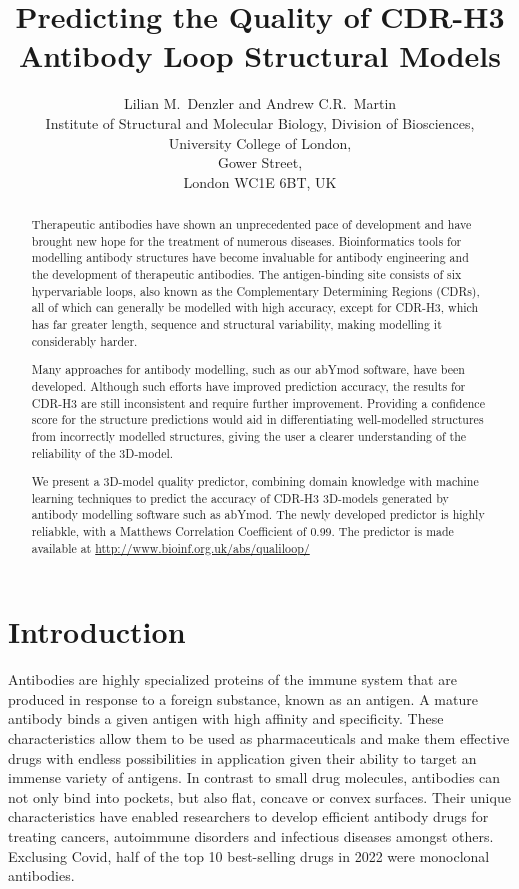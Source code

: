 \documentclass[12pt]{article}
\title{Predicting the Quality of CDR-H3 Antibody Loop Structural Models}
\author{Lilian M.\ Denzler and Andrew C.R.\ Martin\\
Institute of Structural and Molecular Biology, Division of Biosciences,\\
University College of London,\\
Gower Street,\\
London WC1E 6BT, UK
}
\begin{document}
\maketitle

\begin{abstract}
  Therapeutic antibodies have shown an unprecedented pace of
  development and have brought new hope for the treatment of numerous
  diseases. Bioinformatics tools for modelling antibody structures
  have become invaluable for antibody engineering and the development
  of therapeutic antibodies. The antigen-binding site consists of six
  hypervariable loops, also known as the Complementary Determining
  Regions (CDRs), all of which can generally be modelled with high accuracy,
  except for CDR-H3, which has
  far greater length, sequence and structural variability, 
  making modelling it considerably harder.

  Many approaches for antibody modelling, such as our
  abYmod software, have been developed. Although such efforts have
  improved prediction accuracy, the results for CDR-H3 are
  still inconsistent and require further improvement. Providing a
  confidence score for the structure predictions would aid in
  differentiating well-modelled structures from incorrectly modelled
  structures, giving the user a clearer understanding of the
  reliability of the 3D-model.

  We present a 3D-model quality predictor, combining domain knowledge
  with machine learning techniques to predict the accuracy of CDR-H3
  3D-models generated by antibody modelling software such as abYmod. The
  newly developed predictor is highly reliabkle, with a Matthews Correlation Coefficient
  of 0.99. The predictor
  is made available at \url{http://www.bioinf.org.uk/abs/qualiloop/}
\end{abstract}

\section{Introduction}

Antibodies are highly specialized proteins of the immune system that
are produced in response to a foreign substance, known as an antigen. A
mature antibody binds a given antigen with high affinity and specificity. These characteristics allow them to be used as pharmaceuticals and make them effective drugs with endless possibilities in application given their ability to target an immense variety of antigens.
In contrast to small drug molecules, antibodies can not
only bind into pockets, but also flat, concave or convex
surfaces\cite{MacCallum1996}. Their unique characteristics have enabled 
researchers to develop efficient antibody drugs for treating cancers,
autoimmune disorders and infectious diseases amongst others\cite{Lu2020}.
Exclusing Covid, half of the top 10 best-selling drugs in
2022 were monoclonal antibodies\cite{Buntz:TopDrugs2022}.
\end{document}
